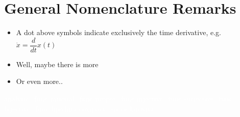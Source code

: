 \section*{General Nomenclature Remarks}
\vspace{0.1cm}
\begin{itemize}
\item A dot above symbols indicate exclusively the time derivative, e.g. $\dot{x} = \dfrac{d}{dt}x(t)$
\item Well, maybe there is more
\item Or even more..
\end{itemize}

\textcolor{white}{\gls{analytic_func} \gls{rational_func} \gls{proper_func} \gls{injective_func} \gls{surjective_func} \gls{bijective_func} \gls{lipschitz} \gls{compact_space} \gls{hurwitz}}
